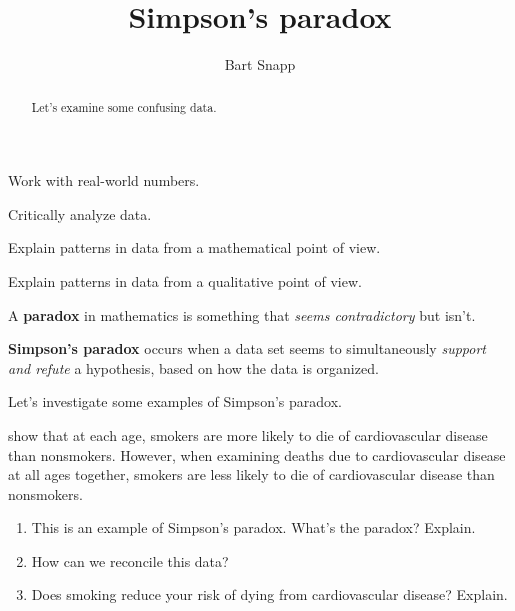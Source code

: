 \documentclass[nooutcomes,noauthor,hints,handout,12pt]{ximera}
\title{Simpson's paradox}
\author{Bart Snapp}
\begin{document}
\begin{abstract}
  Let's examine some confusing data.
\end{abstract}
\maketitle

\begin{listOutcomes}
\item Work with real-world numbers.
\item Critically analyze data.
\item Explain patterns in data from a mathematical point of view.
\item Explain patterns in data from a qualitative point of view.
\end{listOutcomes}


A \textbf{paradox} in mathematics is something that \textit{seems
contradictory} but isn't.



\textbf{Simpson's paradox} occurs when a data set seems to
simultaneously \textit{support and refute} a hypothesis, based on how
the data is organized.



Let's investigate some examples of Simpson's paradox. 


\mynewpage



\begin{question}

  show that at each age, smokers are more likely to die of
  cardiovascular disease than nonsmokers.  However, when examining
  deaths due to cardiovascular disease at all ages together, smokers
  are less likely to die of cardiovascular disease than nonsmokers.

\begin{enumerate}
\item This is an example of Simpson's paradox. What's the paradox? Explain.
\item How can we reconcile this data?
\item Does smoking reduce your risk of dying from cardiovascular disease? Explain.
\end{enumerate}
\end{question}
\mynewpage
\end{document}
